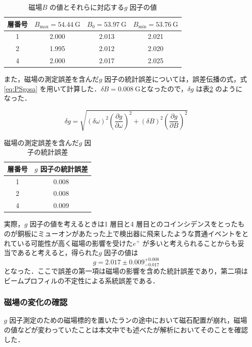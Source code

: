 \begin{table}[h]
	\centering
	\caption{磁場$B$ の値とそれらに対応する$g$ 因子の値}
	\begin{tabular}{cccc}\toprule
	層番号 & $B_{\mathrm{max}} = 54.44~\mathrm{G}$ & $B_{0} = 53.97~\mathrm{G}$ & $B_{\mathrm{min}} = 53.76~\mathrm{G}$ \\ \midrule
	1 & 2.000 & 2.013 & 2.021 \\
	2 & 1.995 & 2.012 & 2.020 \\
	4 & 2.000 & 2.017 & 2.025 \\ \bottomrule 
	\end{tabular}\label{tab:PSgSysErr}
\end{table}%

また，磁場の測定誤差を含んだ$g$ 因子の統計誤差については，誤差伝播の式，式\eqref{eq:PSgosa} を用いて計算した．$\delta B = 0.008~\mathrm{G}$となったので，$\delta g$ は表\ref{tab:PSgStatErr} のようになった．

\begin{equation}
\delta g = \sqrt{\left(\delta\omega\right)^{2}\left(\frac{\partial g}{\partial\omega}\right)^{2} + \left(\delta B\right)^{2}\left(\frac{\partial g}{\partial B}\right)^{2}}
\label{eq:PSgosa}
\end{equation}%

\begin{table}
	\centering
	\caption{磁場の測定誤差を含んだ$g$ 因子の統計誤差}
	\begin{tabular}{cc}\toprule
	層番号 & $g$ 因子の統計誤差\\ \midrule
	1 & 0.008 \\ 
	2 & 0.008 \\
	4 & 0.009 \\ \bottomrule
	\end{tabular}\label{tab:PSgStatErr}
\end{table}%

実際，$g$ 因子の値を考えるときは1 層目と4 層目とのコインシデンスをとったものが銅板にミューオンがあたった上で検出器に飛来したような貫通イベントをとれている可能性が高く磁場の影響を受けた$e^{+}$ が多いと考えられることからも妥当であると考えると，得られた$g$ 因子の値は
\[g = 2.017 \pm 0.009 ^{+0.008}_{-0.017}\]
となった．ここで誤差の第一項は磁場の影響を含めた統計誤差であり，第二項はビームプロフィルの不定性による系統誤差である．

\subsubsection{磁場の変化の確認}
\label{subsubsec:PSMagChangeCheck}
$g$ 因子測定のための磁場標的を置いたランの途中において磁石配置が崩れ，磁場の値などが変わっていたことは本文中でも述べたが解析においてそのことを確認した．

